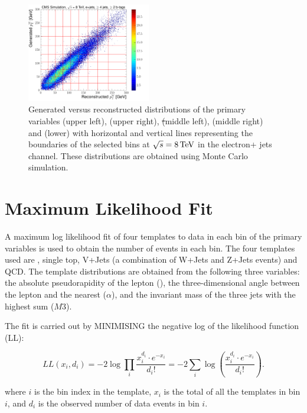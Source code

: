 \begin{figure}[hbtp]
	 \includegraphics[width=0.48\textwidth]{Chapters/04_Analysis/04b_XSections/images/binning/electron_WPT_8TeV.pdf}\hfill
	 \caption{Generated versus reconstructed distributions of the primary variables \met (upper left), \HT (upper
	 right), \st (middle left), \mt (middle right) and \wpt (lower) with horizontal and vertical lines
	 representing the boundaries of the selected bins at $\sqrt{s}=8\,\text{Te\hspace{-.08em}V}$ in the electron+ jets channel. These
	 distributions are obtained using \ttbar Monte Carlo simulation.}
     \label{fig:binning_8TeV_electron}
 \end{figure}

\section{Maximum Likelihood Fit}
\label{maximum_likelihood_fit}
A maximum log likelihood fit of four templates to data in each bin of the primary variables is used to obtain
the number of events in each bin. The four templates used are \ttbar, single top, V+Jets (a combination of
W+Jets and Z+Jets events) and QCD. The template distributions are obtained from the following three
variables: the absolute pseudorapidity of the lepton (\abseta), the three-dimensional angle between the lepton
and the nearest \bjet ($\alpha$), and the invariant mass of the three jets with the highest \pt sum ($M3$).

The fit is carried out by MINIMISING the negative log of the likelihood function (LL):

\begin{equation}
\label{log_likelihood}
LL\left(x_i, d_i\right) = -2 \log{\prod\limits_{i}\frac{x_i^{d_i}\cdot
e^{-x_i}}{d_i!}}=-2\sum\limits_{i}\log{\left(\frac{x_i^{d_i}\cdot e^{-x_i}}{d_i!}\right)}.
\end{equation}

where $i$ is the bin index in the template, $x_i$ is the total of all the templates in bin $i$, and $d_i$ is
the observed number of data events in  bin $i$.

